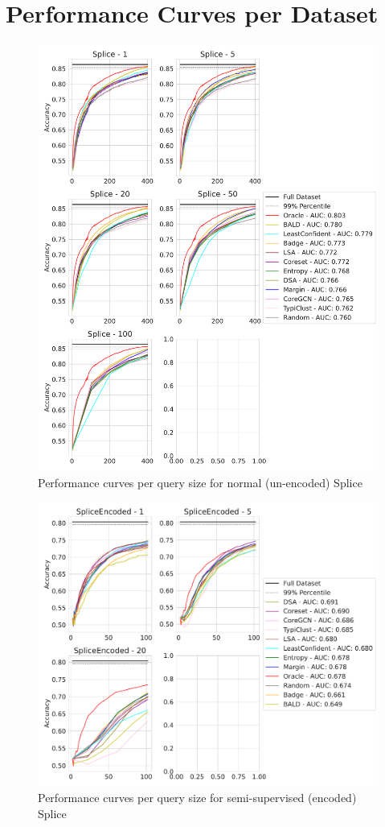 \documentclass[]{article}
\begin{document}
\section{Performance Curves per Dataset}\label{app:all_results}
\begin{figure}[H]
	\centering
	\caption{Performance curves per query size for normal (un-encoded) Splice}
	\includegraphics[width=\linewidth]{img/eval_splice}
\end{figure}
\begin{figure}[H]
	\centering
	\caption{Performance curves per query size for semi-supervised (encoded) Splice}
	\includegraphics[width=\linewidth]{img/eval_splice_enc}
\end{figure}
\end{document}
